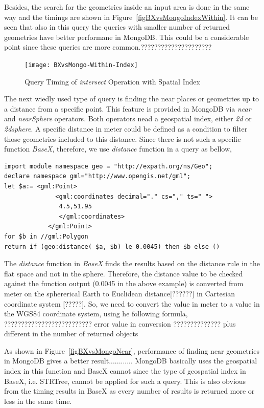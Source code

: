 \documentclass[a4paper,12pt]{article}
\begin{document}
Besides, the search for the geometries inside an input area is done in the same way and the timings are shown in Figure~\ref{figBXvsMongoIndexWithin}. It can be seen that also in this query the queries with smaller number of returned geometries have better performane in MongoDB. This could be a considerable point since these queries are more common.?????????????????????

\begin{figure}
\centering
\texttt{[image: BXvsMongo-Within-Index]}
\caption{Query Timing of \textit{intersect} Operation with Spatial Index}
\label{figBXvsMongoIndexIntersects}
\end{figure}

The next wiedly used type of query is finding the near places or geometries up to a distance from a specific point. This feature is provided in MongoDB via \textit{near} and \textit{nearSphere} operators. Both operators nead a geospatial index, either \textit{2d} or \textit{2dsphere}. A specific distance in meter could be defined as a condition to filter those geometries included to this distance. Since there is not such a specific function \textit{BaseX}, therefore, we use \textit{distance} function in a query as bellow,

\begin{verbatim}
import module namespace geo = "http://expath.org/ns/Geo";
declare namespace gml="http://www.opengis.net/gml";
let $a:= <gml:Point>
              <gml:coordinates decimal="." cs="," ts=" ">
               4.5,51.95 
               </gml:coordinates>
            </gml:Point>
for $b in //gml:Polygon 
return if (geo:distance( $a, $b) le 0.0045) then $b else ()
\end{verbatim}

The \textit{distance} function in \textit{BaseX} finds the results based on the distance rule in the flat space and not in the sphere. Therefore, the distance value to be checked against the function output (0.0045 in the above example) is converted from meter on the sphererical Earth to Euclidean distance[??????] in Cartesian coordinate system [?????].
So, we need to convert the value in meter to a value in the WGS84 coordinate system, using he following formula,
??????????????????????????
error value in conversion ?????????????? plus different in the number of returned objects

As shown in Figure~\ref{figBXvsMongoNear}, performance of finding near geometries in MongoDB gives a better result............
MongoDB basically uses the geospatial index in this function and BaseX cannot since the type of geospatial index in BaseX, i.e. STRTree, cannot be applied for such a query. This is also obvious from the timing results in BaseX as every number of results is returned more or less in the same time.
\end{document}

